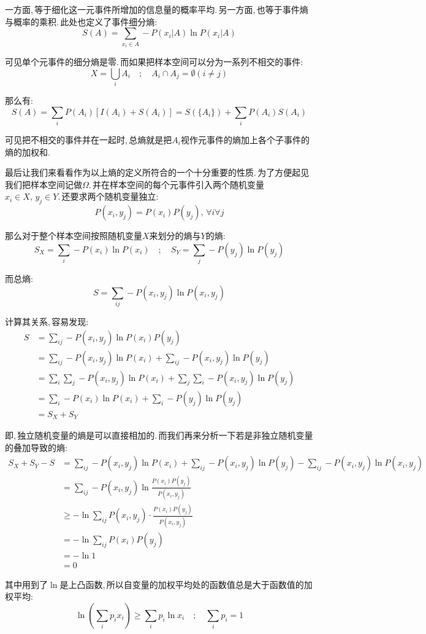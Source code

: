一方面,\,等于细化这一元事件所增加的信息量的概率平均.\,另一方面,\,也等于事件熵与概率的乘积.\,此处也定义了事件细分熵:
\[S(A)=\sum_{x_i\in A}-P(x_i|A)\ln P(x_i|A)\]

可见单个元事件的细分熵是零.\,而如果把样本空间可以分为一系列不相交的事件:
\[X=\bigcup_i A_i\quad ;\quad A_i\cap A_j=\emptyset(i\neq j)\]

那么有:
\[S(A)=\sum_i P(A_i)[I(A_i)+S(A_i)]=S(\{A_i\})+\sum_i P(A_i)S(A_i)\]

可见把不相交的事件并在一起时,\,总熵就是把\(A_i\)视作元事件的熵加上各个子事件的熵的加权和.

最后让我们来看看作为以上熵的定义所符合的一个十分重要的性质.\,为了方便起见我们把样本空间记做$\Omega$.\,并在样本空间的每个元事件引入两个随机变量$x_i\in X,\,y_j\in Y$.\,还要求两个随机变量独立:
\[P(x_i,y_j)=P(x_i)P(y_j),\,\forall i\forall j\]

那么对于整个样本空间按照随机变量$X$来划分的熵与$Y$的熵:
\[S_X=\sum_i -P(x_i)\ln P(x_i)\quad ;\quad S_Y=\sum_j -P(y_j)\ln P(y_j)\]

而总熵:
\[S=\sum_{ij}-P(x_i,y_j)\ln P(x_i,y_j)\]

计算其关系,\,容易发现:
\begin{align*}
S &=\sum_{ij}-P(x_i,y_j)\ln P(x_i)P(y_j)\\
  &=\sum_{ij}-P(x_i,y_j)\ln P(x_i)+\sum_{ij}-P(x_i,y_j)\ln P(y_j)\\
  &=\sum_{i}\sum_{j}-P(x_i,y_j)\ln P(x_i)+\sum_{j}\sum_{i}-P(x_i,y_j)\ln P(y_j)\\
  &=\sum_i -P(x_i)\ln P(x_i)+\sum_i -P(y_j)\ln P(y_j)\\
  &=S_X+S_Y
\end{align*}

即,\,独立随机变量的熵是可以直接相加的.\,而我们再来分析一下若是非独立随机变量的叠加导致的熵:
\begin{align*}
S_X+S_Y-S &=\sum_{ij}-P(x_i,y_j)\ln P(x_i)+\sum_{ij}-P(x_i,y_j)\ln P(y_j)-\sum_{ij}-P(x_i,y_j)\ln P(x_i,y_j)\\
	      &=\sum_{ij}-P(x_i,y_j)\ln\frac{P(x_i)P(y_j)}{P(x_i,y_j)}\\
	      &\geqslant -\ln\sum_{ij}P(x_i,y_j)\cdot\frac{P(x_i)P(y_j)}{P(x_i,y_j)}\\
	      &=-\ln\sum_{ij}P(x_i)P(y_j)\\
	      &=-\ln 1\\
	      &=0
\end{align*}


其中用到了$\ln$是上凸函数,\,所以自变量的加权平均处的函数值总是大于函数值的加权平均:
\[\ln(\sum_i p_ix_i)\geqslant \sum_ip_i\ln x_i\quad ; \quad \sum_ip_i=1\]

